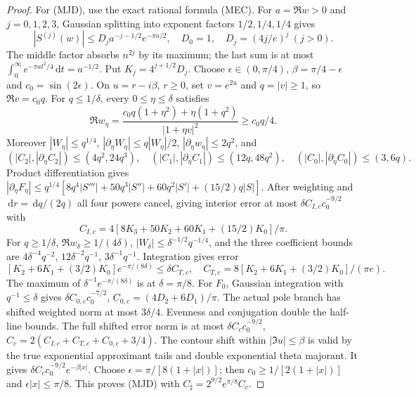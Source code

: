 \documentclass[11pt]{article}
\theoremstyle{remark}\newtheorem{remark}[theorem]{Remark}
\newcommand{\dd}{\,\mathrm d}
\begin{document}
\begin{proof}
For (MJD), use the exact rational formula (MEC). For
$a=\Re w>0$ and $j=0,1,2,3$, Gaussian splitting into exponent
factors $1/2,1/4,1/4$ gives
\[
 |S^{(j)}(w)|\le D_ja^{-j-1/2}e^{-\pi a/2},
 \quad D_0=1,\quad D_j=(4j/e)^j\ (j>0).
\]
The middle factor absorbs $n^{2j}$ by its maximum; the last sum
is at most $\int_0^\infty e^{-\pi at^2/4}\dd t=a^{-1/2}$.
Put $K_j=4^{j+1/2}D_j$.
Choose $\epsilon\in(0,\pi/4)$, $\beta=\pi/4-\epsilon$ and
$c_0=\sin(2\epsilon)$. On $u=r-i\beta$, $r\ge0$, set
$v=e^{2u}$ and $q=|v|\ge1$, so $\Re v=c_0q$.
For $q\le1/\delta$, every $0\le\eta\le\delta$ satisfies
\[
 \Re w_\eta=
 \frac{c_0q(1+\eta^2)+\eta(1+q^2)}{|1+\eta v|^2}\ge c_0q/4.
\]
Moreover $|W_\eta|\le q^{1/4}$,
$|\partial_\eta W_\eta|\le q|W_\eta|/2$,
$|\partial_\eta w_\eta|\le2q^2$, and
\[
 (|C_2|,|\partial_\eta C_2|)\le(4q^2,24q^3),\quad
 (|C_1|,|\partial_\eta C_1|)\le(12q,48q^2),\quad
 (|C_0|,|\partial_\eta C_0|)\le(3,6q).
\]
Product differentiation gives
$|\partial_\eta F_\eta|\le q^{1/4}
[8q^4|S'''|+50q^3|S''|+60q^2|S'|+(15/2)q|S|]$.
After weighting and $\dd r=\dd q/(2q)$ all four powers cancel,
giving interior error at most $\delta C_{I,c}c_0^{-9/2}$ with
\[
 C_{I,c}=4[8K_3+50K_2+60K_1+(15/2)K_0]/\pi.
\]
For $q\ge1/\delta$, $\Re w_\delta\ge1/(4\delta)$,
$|W_\delta|\le\delta^{-1/2}q^{-1/4}$, and the three coefficient
bounds are $4\delta^{-4}q^{-2}$, $12\delta^{-2}q^{-1}$,
$3\delta^{-1}q^{-1}$. Integration gives error
\[
 [K_2+6K_1+(3/2)K_0]e^{-\pi/(8\delta)}
 \le\delta C_{T,c},\quad
 C_{T,c}=8[K_2+6K_1+(3/2)K_0]/(\pi e).
\]
The maximum of $\delta^{-1}e^{-\pi/(8\delta)}$ is at $\delta=\pi/8$.
For $F_0$, Gaussian integration with $q^{-1}\le\delta$ gives
$\delta C_{0,c}c_0^{-7/2}$, $C_{0,c}=(4D_2+6D_1)/\pi$.
The actual pole branch has shifted weighted norm at most $3\delta/4$.
Evenness and conjugation double the half-line bounds.
The full shifted error norm is at most
$\delta C_cc_0^{-9/2}$, $C_c=2(C_{I,c}+C_{T,c}+C_{0,c}+3/4)$.
The contour shift within $|\Im u|\le\beta$ is valid by the true
exponential approximant tails and double exponential theta majorant.
It gives $\delta C_cc_0^{-9/2}e^{-\beta|x|}$.
Choose $\epsilon=\pi/[8(1+|x|)]$; then $c_0\ge1/[2(1+|x|)]$
and $\epsilon|x|\le\pi/8$. This proves (MJD) with
$C_\sharp=2^{9/2}e^{\pi/8}C_c$.
\end{proof}
\end{document}
